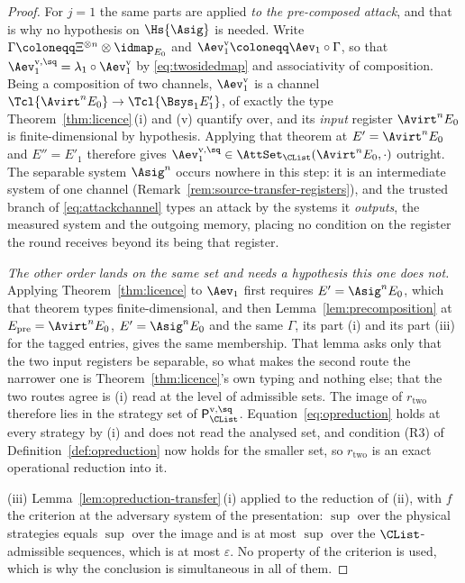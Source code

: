 \begin{proof}
For $j=1$ the same parts are applied \emph{to the pre-composed attack}, and
that is why no hypothesis on $\Hs{\Asig}$ is needed. Write
$\Gamma\coloneqq\Xi^{\otimes n}\otimes\idmap_{E_0}$ and
$\Aev^{\mathrm{v}}_1\coloneqq\Aev_1\circ\Gamma$, so that
$\Aev^{\mathrm{v},\sq}_1=\lambda_1\circ\Aev^{\mathrm{v}}_1$ by
\eqref{eq:twosidedmap} and associativity of composition. Being a composition of
two channels, $\Aev^{\mathrm{v}}_1$ is a channel
$\Tcl{\Avirt^{n}E_0}\to\Tcl{\Bsys_1E'_1}$, of exactly the type
Theorem~\ref{thm:licence}\,(i) and (v) quantify over, and its
\emph{input} register $\Avirt^{n}E_0$ is finite-dimensional by hypothesis.
Applying that theorem at $E'=\Avirt^{n}E_0$ and $E''=E'_1$ therefore gives
$\Aev^{\mathrm{v},\sq}_1\in\AttSet_{\CList}(\Avirt^{n}E_0,\cdot)$ outright.
The separable system $\Asig^{n}$ occurs nowhere in this step: it is an
intermediate system of one channel (Remark~\ref{rem:source-transfer-registers}),
and the trusted branch of \eqref{eq:attackchannel} types an attack by the
systems it \emph{outputs}, the measured system and the outgoing memory,
placing no condition on the register the round receives beyond its being that
register.

\emph{The other order lands on the same set and needs a hypothesis this one
does not.} Applying Theorem~\ref{thm:licence} to $\Aev_1$ first requires
$E'=\Asig^{n}E_0$, which that theorem types finite-dimensional, and then
Lemma~\ref{lem:precomposition} at $E_{\mathrm{pre}}=\Avirt^{n}E_0$,
$E'=\Asig^{n}E_0$ and the same $\Gamma$, its part (i) and its part (iii) for
the tagged entries, gives the same membership. That lemma asks only that the
two input registers be separable, so what makes the second route the narrower
one is Theorem~\ref{thm:licence}'s own typing and nothing else; that the two
routes agree is (i) read at the level of admissible sets. The image of
$r_{\mathrm{two}}$ therefore lies in the strategy set of
$\mathsf{P}^{\mathrm{v},\sq}_{\CList}$. Equation~\eqref{eq:opreduction} holds
at every strategy by (i) and does not read the analysed set, and condition (R3)
of Definition~\ref{def:opreduction} now holds for the smaller set, so
$r_{\mathrm{two}}$ is an exact operational reduction into it.

(iii) Lemma~\ref{lem:opreduction-transfer}\,(i) applied to the reduction of
(ii), with $f$ the criterion at the adversary system of the presentation:
$\sup$ over the physical strategies equals $\sup$ over the image and is at most
$\sup$ over the $\CList$-admissible sequences, which is at most $\varepsilon$.
No property of the criterion is used, which is why the conclusion is
simultaneous in all of them.


\end{proof}
